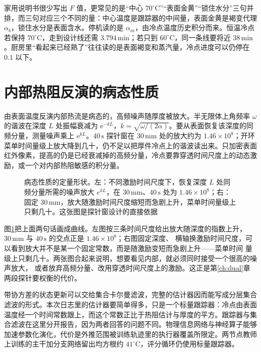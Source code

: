 家用说明书很少写出 \(F\) 值，更常见的是“中心 \(70^\circ\mathrm{C}\)”“表面金黄”“锁住水分”三句并排，而三句对应三个不同的量：中心温度是跟踪器的中间量，表面金黄是褐变代理 \(\alpha_b\)，锁住水分是表面含水。停机读的是 \(\alpha_m\)，由冷点温度历史积分而来。恒温冷点若保持 \(70^\circ\mathrm{C}\)，走到设计线还需 \(3.794\,\mathrm{min}\)；若只到 \(60^\circ\mathrm{C}\)，同一条线要将近 \(38\,\mathrm{min}\)。厨房里“看起来已经熟了”往往读的是表面褐变和蒸汽量，冷点进度可以仍停在 \(0.1\) 以下。

\section{内部热阻反演的病态性质}

由表面温度反演内部热流是病态的，高频噪声随厚度被放大\cite{ozisik2000}。半无限体上角频率 \(\omega\) 的谐波在深度 \(L\) 处振幅衰减为 \(\mathrm{e}^{-kL}\)，\(k=\sqrt{\omega/(2\alpha)}\)。要从表面恢复该深度的同频分量，测量噪声乘上 \(\mathrm{e}^{kL}\)。\(40\,\mathrm{s}\) 探针窗在 \(30\,\mathrm{mm}\) 处的放大约为 \(1.46\times 10^{8}\)；开环菜单时间量级上放大降到几十，仍不足以把厚件冷点上的谐波读出来。只加密表面红外像素，提高的仍是已经衰减掉的高频分量，冷点要靠穿透时间尺度上的动态激励，或一个对内部热阻敏感的积分量。

\begin{figure}[htbp]
\centering
{}
\caption{病态性质的定量形状。左：不同激励时间尺度下，恢复深度 \(L\) 处同频分量所需的噪声放大 \(e^{kL}\)，在 \(30\,\mathrm{mm}\)、\(40\,\mathrm{s}\) 处为 \(1.46\times10^{8}\)；右：固定 \(30\,\mathrm{mm}\)，放大随激励时间尺度缩短而急剧上升，菜单时间量级上只剩几十。这张图是探针窗设计的直接依据}
\label{fig:illposed}
\end{figure}

图\ref{fig:illposed}{}把上面两句话画成曲线。左图按三条时间尺度给出放大随深度的指数上升，
\(30\,\mathrm{mm}\) 与 \(40\,\mathrm{s}\) 的交点正是 \(1.46\times10^{8}\)；右图固定深度、
横轴换激励时间尺度，可以看到放大并不是某一个固定常数，而是随激励变短而急剧上升——菜单时间
量级上只剩几十。两张图合起来说明，想要看见内部，就必须同时接受一个很高的噪声放大，
或者放弃高频分量、改用穿透时间尺度上的激励。这正是第\ref{ch:dual}{}章两段探针要权衡的代价。



带协方差的状态更新可以交给集合卡尔曼滤波\cite{evensen2003}，完整的估计器因而能写成分层集合滤波的形式。本次日志里的估计器要简单得多，只是一个标量跟踪器：冷点由表面温度经一个时间常数跟上，而这个常数正比于热阻估计与厚度的平方。跟踪器与集合滤波在这里分开报告，因为两者回答的问题不同。物理信息网络与神经算子能够加速参数化演化\cite{raissi2019,li2021fno,lu2021deeponet}，代价是外推范围被训练轨迹里的执行器覆盖所限定。两节点教师上训练的主干加分支网络留出均方根约 \(41^\circ\mathrm{C}\)，评分循环仍使用标量跟踪器。

